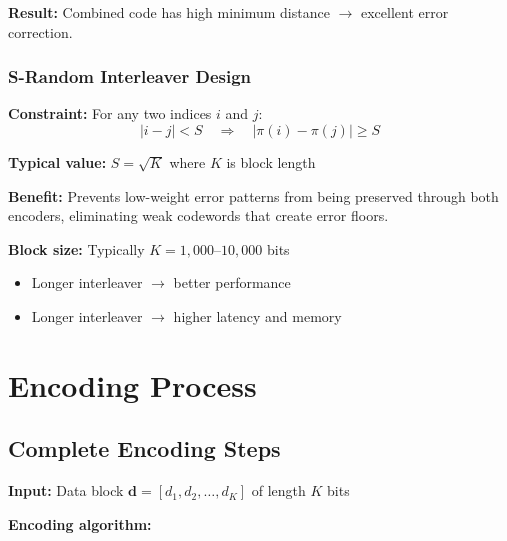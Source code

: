\textbf{Result:} Combined code has high minimum distance $\rightarrow$ excellent error correction.

\subsubsection{S-Random Interleaver Design}

\textbf{Constraint:} For any two indices $i$ and $j$:
\begin{equation}
|i - j| < S \quad \Rightarrow \quad |\pi(i) - \pi(j)| \geq S
\end{equation}

\textbf{Typical value:} $S = \sqrt{K}$ where $K$ is block length

\textbf{Benefit:} Prevents low-weight error patterns from being preserved through both encoders, eliminating weak codewords that create error floors.

\textbf{Block size:} Typically $K = 1{,}000$--$10{,}000$ bits
\begin{itemize}
\item Longer interleaver $\rightarrow$ better performance
\item Longer interleaver $\rightarrow$ higher latency and memory
\end{itemize}

\section{Encoding Process}

\subsection{Complete Encoding Steps}

\textbf{Input:} Data block $\mathbf{d} = [d_1, d_2, \ldots, d_K]$ of length $K$ bits

\textbf{Encoding algorithm:}

